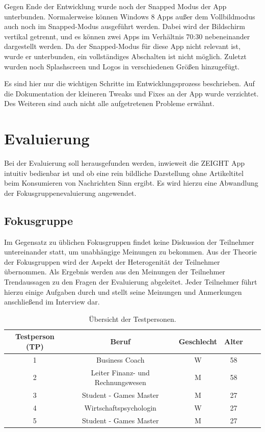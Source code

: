 \documentclass[12pt,a4paper,bibtotoc,abstracton]{scrartcl}
\begin{document}
Gegen Ende der Entwicklung wurde noch der Snapped Modus der App unterbunden. Normalerweise können Windows 8 Apps außer dem Vollbildmodus auch noch im Snapped-Modus ausgeführt werden. Dabei wird der Bildschirm vertikal getrennt, und es können zwei Apps im Verhältnis 70:30 nebeneinander dargestellt werden. Da der Snapped-Modus für diese App nicht relevant ist, wurde er unterbunden, ein vollständiges Abschalten ist nicht möglich. Zuletzt wurden noch Splashscreen und Logos in verschiedenen Größen hinzugefügt.

Es sind hier nur die wichtigen Schritte im Entwicklungsprozess beschrieben. Auf die Dokumentation der kleineren Tweaks und Fixes an der App wurde verzichtet. Des Weiteren sind auch nicht alle aufgetretenen Probleme erwähnt. 

\newpage
\section{Evaluierung} 
\label{sec:evaluierung}
Bei der Evaluierung soll herausgefunden werden, inwieweit die ZEIGHT App intuitiv bedienbar ist und ob eine rein bildliche Darstellung ohne Artikeltitel beim Konsumieren von Nachrichten Sinn ergibt. Es wird hierzu eine Abwandlung der Fokusgruppenevaluierung angewendet. 

\subsection{Fokusgruppe}
\label{subsec:fokusgruppe}
Im Gegensatz zu üblichen Fokusgruppen findet keine Diskussion der Teilnehmer untereinander statt, um unabhängige Meinungen zu bekommen. Aus der Theorie der Fokusgruppen wird der Aspekt der Heterogenität der Teilnehmer übernommen. Als Ergebnis werden aus den Meinungen der Teilnehmer Trendaussagen zu den Fragen der Evaluierung abgeleitet. Jeder Teilnehmer führt hierzu einige Aufgaben durch und stellt seine Meinungen und Anmerkungen anschließend im Interview dar.

\begin{table}[h]
\centering
\begin{tabular}{|c|c|c|c|c|c|}
\hline 
\rule[-1ex]{0pt}{3.5ex} \textbf{Testperson (TP)} & \textbf{Beruf} & \textbf{Geschlecht} & \textbf{Alter} \\ 
\hline 
\rule[-1ex]{0pt}{2.5ex} 1 & Business Coach & W & 58 \\ 
\hline 
\rule[-1ex]{0pt}{2.5ex} 2 & Leiter Finanz- und Rechnungswesen & M & 58 \\ 
\hline 
\rule[-1ex]{0pt}{2.5ex} 3 & Student - Games Master & M & 27  \\ 
\hline 
\rule[-1ex]{0pt}{2.5ex} 4 & Wirtschaftspsychologin & W & 27 \\ 
\hline 
\rule[-1ex]{0pt}{2.5ex} 5 & Student - Games Master & M & 27 \\ 
\hline 
\end{tabular} 
\caption{Übersicht der Testpersonen.}
\label{tab:testpersonen}
\end{table}
\end{document}
